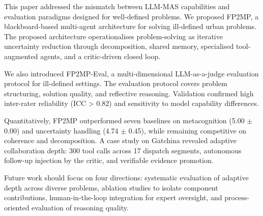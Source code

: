 This paper addressed the mismatch between LLM-MAS capabilities and evaluation paradigms designed for well-defined problems.
We proposed FP2MP, a blackboard-based multi-agent architecture for solving ill-defined urban problems.
The proposed architecture operationalises problem-solving as iterative uncertainty reduction through decomposition, shared memory, specialised tool-augmented agents, and a critic-driven closed loop.

We also introduced FP2MP-Eval, a multi-dimensional LLM-as-a-judge evaluation protocol for ill-defined settings.
The evaluation protocol covers problem structuring, solution quality, and reflective reasoning.
Validation confirmed high inter-rater reliability (ICC > 0.82) and sensitivity to model capability differences.

Quantitatively, FP2MP outperformed seven baselines on metacognition (5.00 $\pm$ 0.00) and uncertainty handling (4.74 $\pm$ 0.45), while remaining competitive on coherence and decomposition.
A case study on Gatchina revealed adaptive collaboration depth: 300 tool calls across 17 dispatch segments, autonomous follow-up injection by the critic, and verifiable evidence promotion.

Future work should focus on four directions: systematic evaluation of adaptive depth across diverse problems, ablation studies to isolate component contributions, human-in-the-loop integration for expert oversight, and process-oriented evaluation of reasoning quality.